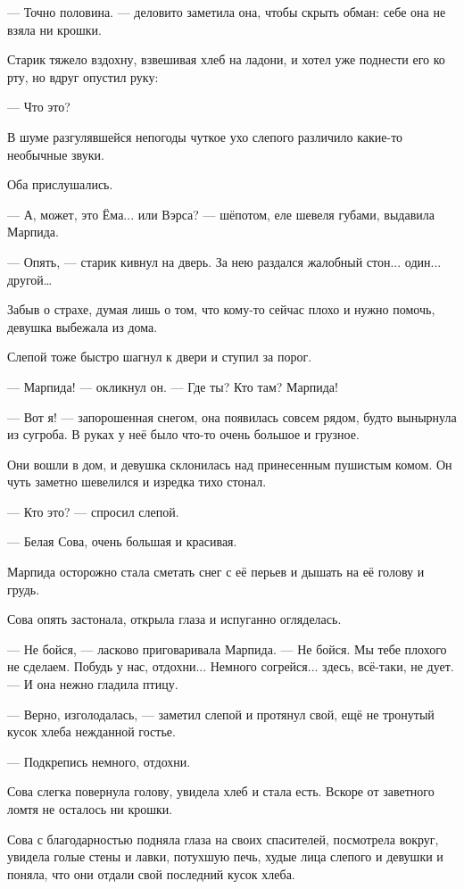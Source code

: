 \documentclass[12pt, a4paper, openany]{book}
\begin{document}
	— Точно половина. — деловито заметила она, чтобы скрыть обман: себе она не взяла ни крошки.
	
	Старик тяжело вздохну, взвешивая хлеб на ладони, и хотел уже поднести его ко рту, но вдруг опустил руку:
	
	— Что это?
	
	В шуме разгулявшейся непогоды чуткое ухо слепого различило какие-то необычные звуки.
	
	Оба прислушались.
	
	— А, может, это Ёма... или Вэрса? — шёпотом, еле шевеля губами, выдавила Марпида.
	
	— Опять, — старик кивнул на дверь. За нею раздался жалобный стон... один... другой…
	
	Забыв о страхе, думая лишь о том, что кому-то сейчас плохо и нужно помочь, девушка выбежала из дома.
	
	Слепой тоже быстро шагнул к двери и ступил за порог.
	
	— Марпида! — окликнул он. — Где ты? Кто там? Марпида!
	
	— Вот я! — запорошенная снегом, она появилась совсем рядом, будто вынырнула из сугроба. В руках у неё было что-то очень большое и грузное.
	
	Они вошли в дом, и девушка склонилась над принесенным пушистым комом. Он чуть заметно шевелился и изредка тихо стонал.
	
	— Кто это? — спросил слепой.
	
	— Белая Сова, очень большая и красивая.
	
	Марпида осторожно стала сметать снег с её перьев и дышать на её голову и грудь.
	
	Сова опять застонала, открыла глаза и испуганно огляделась.
	
	— Не бойся, — ласково приговаривала Марпида. — Не бойся. Мы тебе плохого не сделаем. Побудь у нас, отдохни... Немного согрейся... здесь, всё-таки, не дует. — И она нежно гладила птицу.
	
	— Верно, изголодалась, — заметил слепой и протянул свой, ещё не тронутый кусок хлеба нежданной гостье.
	
	— Подкрепись немного, отдохни.
	
	Сова слегка повернула голову, увидела хлеб и стала есть. Вскоре от заветного ломтя не осталось ни крошки.
	
	Сова с благодарностью подняла глаза на своих спасителей, посмотрела вокруг, увидела голые стены и лавки, потухшую печь, худые лица слепого и девушки и поняла, что они отдали свой последний кусок хлеба.
	
\end{document}
